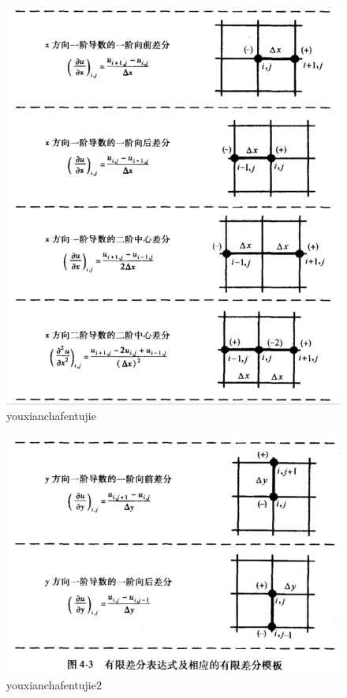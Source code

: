 \begin{figure}
	\centering
	\includegraphics[width=0.7\linewidth]{figures/youxianchafentujie.png}
	\caption{youxianchafentujie}
	\label{fig:youxianchafentujie}
\end{figure}

\begin{figure}
	\centering
	\includegraphics[width=0.7\linewidth]{figures/youxianchafentujie2.png}
	\caption{youxianchafentujie2}
	\label{fig:youxianchafentujie2}
\end{figure}

